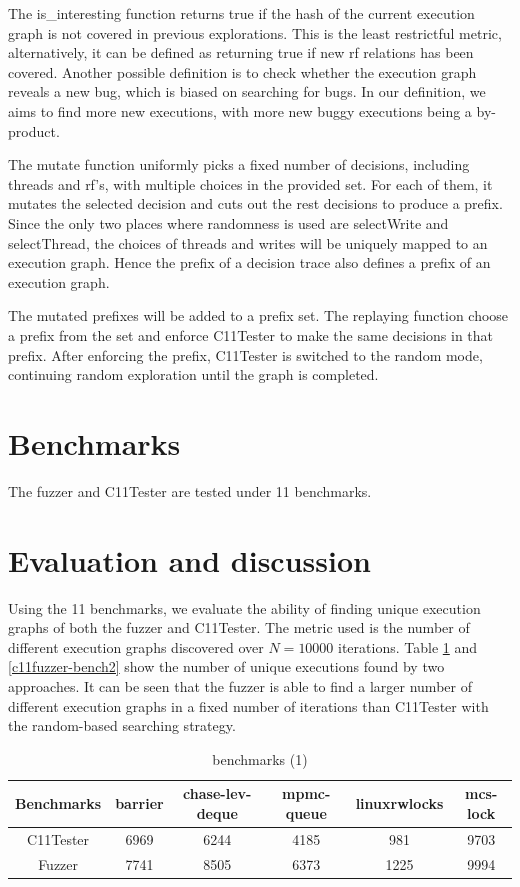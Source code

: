 The is\_interesting function returns true if the hash of the current execution graph is not covered in previous explorations. This is the least restrictful metric, alternatively, it can be defined as returning true if new rf relations has been covered. Another possible definition is to check whether the execution graph reveals a new bug, which is biased on searching for bugs. In our definition, we aims to find more new executions, with more new buggy executions being a by-product. 

The mutate function uniformly picks a fixed number of decisions, including threads and rf's, with multiple choices in the provided set. For each of them, it mutates the selected decision and cuts out the rest decisions to produce a prefix. Since the only two places where randomness is used are selectWrite and selectThread, the choices of threads and writes will be uniquely mapped to an execution graph. Hence the prefix of a decision trace also defines a prefix of an execution graph. 


The mutated prefixes will be added to a prefix set. The replaying function choose a prefix from the set and enforce C11Tester to make the same decisions in that prefix. After enforcing the prefix,  C11Tester is switched to the random mode, continuing random exploration until the graph is completed. 

\section{Benchmarks}

The fuzzer and C11Tester are tested under 11 benchmarks.

\section{Evaluation and discussion}

Using the 11 benchmarks, we evaluate the ability of finding unique execution graphs of both the fuzzer and C11Tester. The metric used is the number of different execution graphs discovered over $N = 10000$ iterations. Table \ref{c11fuzzer-bench1} and \ref{c11fuzzer-bench2} show the number of unique executions found by two approaches. It can be seen that the fuzzer is able to find a larger number of different execution graphs in a fixed number of iterations than C11Tester with the random-based searching strategy. 


\begin{table}[h!]
    \begin{tabular}{ |c|ccccc| } 
     \hline
     Benchmarks & barrier & chase-lev-deque & mpmc-queue & linuxrwlocks & mcs-lock \\ 
     \hline
     C11Tester & 6969  & 6244 & 4185 &  981 & 9703 \\ 
     Fuzzer & 7741 & 8505  & 6373& 1225 &  9994   \\ 
     \hline
    \end{tabular}
    \caption{benchmarks (1)}
    \label{c11fuzzer-bench1}
    
\end{table}

